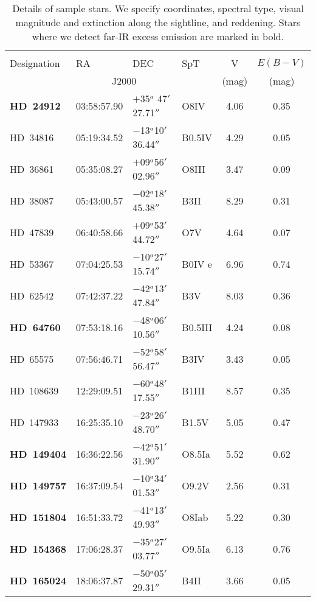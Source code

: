 \documentclass[tradiabstract]{aa} %
\begin{document}
\begin{table*} [h!tb]
\begin{center}
  \caption{Details of sample stars. We specify coordinates, spectral
    type, visual magnitude and extinction along the sightline, and
    reddening. { Stars where we detect far-IR excess emission are
      marked in bold.}
    \label{sample.tab}}
\begin{tabular}{llllcc}    
  \hline
    \hline
& & & &  &  \\    
Designation      & RA & DEC & {SpT} & V & $E(B-V)$ \\
  &\multicolumn{2}{c}{J2000} & & (mag) & (mag) \\
  \hline
{\bf HD~24912}  & 03:58:57.90 &$+$35$^{\rm o}$ 47$'$27.71$''$   & O8IV   &4.06  &0.35 \\
HD~34816  &05:19:34.52 & $-$13$^{\rm o}$10$'$36.44$''$  & B0.5IV &4.29  &0.05 \\
HD~36861  &05:35:08.27 & $+$09$^{\rm o}$56$'$02.96$''$  & O8III  &3.47  &0.09 \\
HD~38087  &05:43:00.57& $-$02$^{\rm o}$18$'$45.38$''$   & B3II   &8.29  &0.31 \\
HD~47839  &06:40:58.66& $+$09$^{\rm o}$53$'$44.72$''$    & O7V    &4.64  &0.07 \\
HD~53367  &07:04:25.53 &$-$10$^{\rm o}$27$'$15.74$''$   & B0IV{ e}&6.96    &0.74 \\
HD~62542  &07:42:37.22 &$-$42$^{\rm o}$13$'$47.84$''$   & B3V &8.03      &0.36 \\
{\bf HD~64760}  &07:53:18.16 &$-$48$^{\rm o}$06$'$10.56$''$     & B0.5III &4.24 &0.08 \\
HD~65575  &07:56:46.71 &$-$52$^{\rm o}$58$'$56.47$''$   & B3IV   &3.43  &0.05 \\
HD~108639 &12:29:09.51 &$-$60$^{\rm o}$48$'$17.55$''$   & B1III  &8.57  &0.35 \\
HD~147933 &16:25:35.10 &$-$23$^{\rm o}$26$'$48.70$''$   & B1.5V  &5.05  &0.47 \\
{\bf HD~149404} &16:36:22.56 &$-$42$^{\rm o}$51$'$31.90$''$     & O8.5Ia &5.52  &0.62 \\
{\bf HD~149757} &16:37:09.54 &$-$10$^{\rm o}$34$'$01.53$''$    & O9.2V &2.56   &0.31 \\
{\bf HD~151804} &16:51:33.72 &$-$41$^{\rm o}$13$'$49.93$''$     & O8Iab&5.22    &0.30 \\
{\bf HD~154368} &17:06:28.37 &$-$35$^{\rm o}$27$'$03.77$''$     & O9.5Ia &6.13  &0.76 \\
{\bf HD~165024} &18:06:37.87 &$-$50$^{\rm o}$05$'$29.31$''$     & B4II &3.66    &0.05  \\

\end{tabular}
\end{center}
\end{table*}
\end{document}
